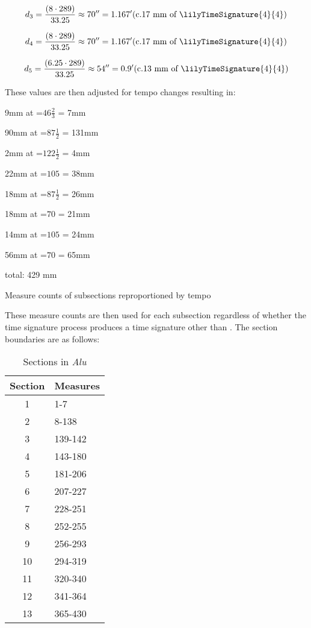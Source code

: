 \begin{equation}
    d_3 = \frac{(8 \cdot 289)}{33.25} \approx 70'' = 1.167' (\text{c.17 mm of \lilyTimeSignature{4}{4})}
\end{equation}

\begin{equation}
    d_4 = \frac{(8 \cdot 289)}{33.25} \approx 70'' = 1.167' (\text{c.17 mm of \lilyTimeSignature{4}{4})}
\end{equation}

\begin{equation}
    d_5 = \frac{(6.25 \cdot 289)}{33.25} \approx 54'' = 0.9' (\text{c.13 mm of \lilyTimeSignature{4}{4})}
\end{equation}

These values are then adjusted for tempo changes resulting in:

\begin{table}[H]
    9mm at \quarterNote=$46\frac{2}{3}$ = 7mm
    
    90mm at \quarterNote=$87\frac{1}{2}$ = 131mm
    
    2mm at \quarterNote=$122\frac{1}{2}$ = 4mm
    
    22mm at \quarterNote=$105$ = 38mm
    
    18mm at \quarterNote=$87\frac{1}{2}$ = 26mm
    
    18mm at \quarterNote=$70$ = 21mm
    
    14mm at \quarterNote=$105$ = 24mm
    
    56mm at \quarterNote=$70$ = 65mm
    
    total: 429 mm
    \caption{Measure counts of subsections reproportioned by tempo}
    \label{tab:rescaled-measure-groups}
\end{table}

These measure counts are then used for each subsection regardless of whether the time signature process produces a time signature other than . The section boundaries are as follows:

\begin{table}[H]
    \begin{tabular}{c|l}
        Section & Measures \\
        \toprule
        1 & 1-7 \\
        2 & 8-138 \\ 
        3 & 139-142 \\ 
        4 & 143-180 \\ 
        5 & 181-206 \\ 
        6 & 207-227 \\
        7 & 228-251 \\
        8 & 252-255 \\
        9 & 256-293 \\
        10 & 294-319 \\
        11 & 320-340 \\
        12 & 341-364 \\
        13 & 365-430 \\
    \end{tabular}
    \caption{Sections in \textit{Alu}}
    \label{tab:alu-sections}
\end{table}

